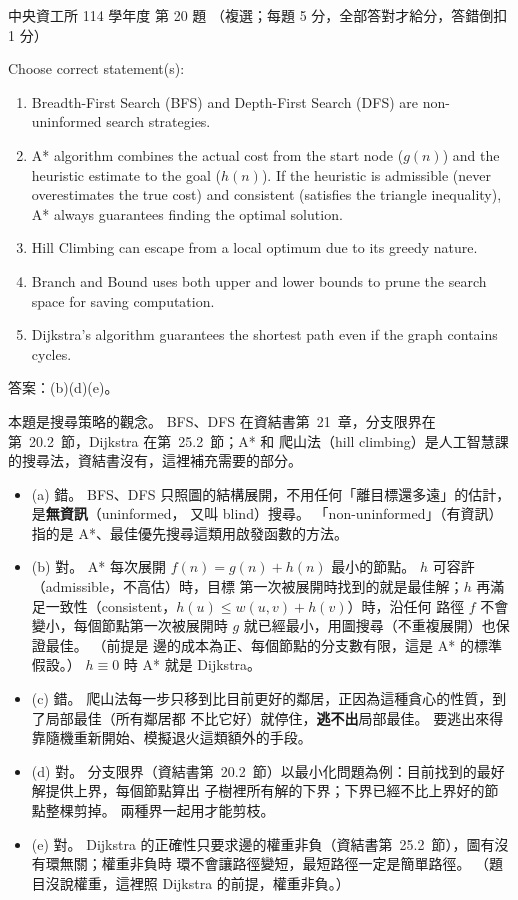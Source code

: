 \begin{pastexam}[label={px:ncu-114-dsa-20}]{中央資工所 114 學年度 第 20 題}
（複選；每題 5 分，全部答對才給分，答錯倒扣 1 分）

Choose correct statement(s):
\begin{enumerate}[label=(\alph*)]
\item Breadth-First Search (BFS) and Depth-First Search (DFS) are non-uninformed search strategies.
\item A* algorithm combines the actual cost from the start node ($g(n)$) and the heuristic estimate to
the goal ($h(n)$). If the heuristic is admissible (never overestimates the true cost) and consistent
(satisfies the triangle inequality), A* always guarantees finding the optimal solution.
\item Hill Climbing can escape from a local optimum due to its greedy nature.
\item Branch and Bound uses both upper and lower bounds to prune the search space for saving
computation.
\item Dijkstra's algorithm guarantees the shortest path even if the graph contains cycles.
\end{enumerate}
\end{pastexam}

\begin{pastsoln}
答案：(b)(d)(e)。

本題是搜尋策略的觀念。 BFS、DFS 在資結書第~21~章，分支限界在第~20.2~節，Dijkstra 在第~25.2~節；A* 和
爬山法（hill climbing）是人工智慧課的搜尋法，資結書沒有，這裡補充需要的部分。

\begin{itemize}
\item (a) 錯。 BFS、DFS 只照圖的結構展開，不用任何「離目標還多遠」的估計，是\textbf{無資訊}（uninformed，
又叫 blind）搜尋。 「non-uninformed」（有資訊）指的是 A*、最佳優先搜尋這類用啟發函數的方法。
\item (b) 對。 A* 每次展開 $f(n) = g(n) + h(n)$ 最小的節點。 $h$ 可容許（admissible，不高估）時，目標
第一次被展開時找到的就是最佳解；$h$ 再滿足一致性（consistent，$h(u) \le w(u, v) + h(v)$）時，沿任何
路徑 $f$ 不會變小，每個節點第一次被展開時 $g$ 就已經最小，用圖搜尋（不重複展開）也保證最佳。 （前提是
邊的成本為正、每個節點的分支數有限，這是 A* 的標準假設。） $h \equiv 0$ 時 A* 就是 Dijkstra。
\item (c) 錯。 爬山法每一步只移到比目前更好的鄰居，正因為這種貪心的性質，到了局部最佳（所有鄰居都
不比它好）就停住，\textbf{逃不出}局部最佳。 要逃出來得靠隨機重新開始、模擬退火這類額外的手段。
\item (d) 對。 分支限界（資結書第~20.2~節）以最小化問題為例：目前找到的最好解提供上界，每個節點算出
子樹裡所有解的下界；下界已經不比上界好的節點整棵剪掉。 兩種界一起用才能剪枝。
\item (e) 對。 Dijkstra 的正確性只要求邊的權重非負（資結書第~25.2~節），圖有沒有環無關；權重非負時
環不會讓路徑變短，最短路徑一定是簡單路徑。 （題目沒說權重，這裡照 Dijkstra 的前提，權重非負。）
\end{itemize}
\end{pastsoln}
